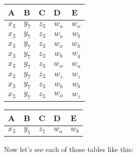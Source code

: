 \documentclass{article}
\begin{document}
\parbox{.45\linewidth}{
\begin{center}
  \begin{tabular}{lllll}
  	\hline
    A & B & C & D & E\\
    \hline
    \multicolumn{1}{|c|}{$x_3$} & \multicolumn{1}{c|}{$y_7$} & \multicolumn{1}{c|}{$z_3$} & \multicolumn{1}{c|}{$w_a$} & \multicolumn{1}{c|}{$w_x$}\\ \hline
    \multicolumn{1}{|c|}{$x_3$} & \multicolumn{1}{c|}{$y_7$} & \multicolumn{1}{c|}{$z_3$} & \multicolumn{1}{c|}{$w_a$} & \multicolumn{1}{c|}{$w_b$}\\ \hline
    \multicolumn{1}{|c|}{$x_3$} & \multicolumn{1}{c|}{$y_7$} & \multicolumn{1}{c|}{$z_3$} & \multicolumn{1}{c|}{$w_x$} & \multicolumn{1}{c|}{$w_h$}\\ \hline
    \multicolumn{1}{|c|}{$x_3$} & \multicolumn{1}{c|}{$y_7$} & \multicolumn{1}{c|}{$z_3$} & \multicolumn{1}{c|}{$w_b$} & \multicolumn{1}{c|}{$w_q$}\\ \hline
    \multicolumn{1}{|c|}{$x_3$} & \multicolumn{1}{c|}{$y_7$} & \multicolumn{1}{c|}{$z_3$} & \multicolumn{1}{c|}{$w_w$} & \multicolumn{1}{c|}{$w_u$}\\ \hline
    \multicolumn{1}{|c|}{$x_3$} & \multicolumn{1}{c|}{$y_7$} & \multicolumn{1}{c|}{$z_3$} & \multicolumn{1}{c|}{$w_z$} & \multicolumn{1}{c|}{$w_z$}\\ \hline
    \multicolumn{1}{|c|}{$x_3$} & \multicolumn{1}{c|}{$y_7$} & \multicolumn{1}{c|}{$z_3$} & \multicolumn{1}{c|}{$w_b$} & \multicolumn{1}{c|}{$w_b$}\\ \hline
    \multicolumn{1}{|c|}{$x_3$} & \multicolumn{1}{c|}{$y_7$} & \multicolumn{1}{c|}{$z_3$} & \multicolumn{1}{c|}{$w_\phi$} & \multicolumn{1}{c|}{$w_z$}\\ \hline
  \end{tabular}
  
\vskip 0.2in
 
  \begin{tabular}{lllll}
  	\hline
    A & B & C & D & E\\
    \hline
    \multicolumn{1}{|c|}{$x_3$} & \multicolumn{1}{c|}{$y_1$} & \multicolumn{1}{c|}{$z_1$} & \multicolumn{1}{c|}{$w_a$} & \multicolumn{1}{c|}{$w_b$}\\ \hline
  \end{tabular}
\end{center}
}

\vskip 0.2in

Now let's see each of those tables like this:
\end{document}
